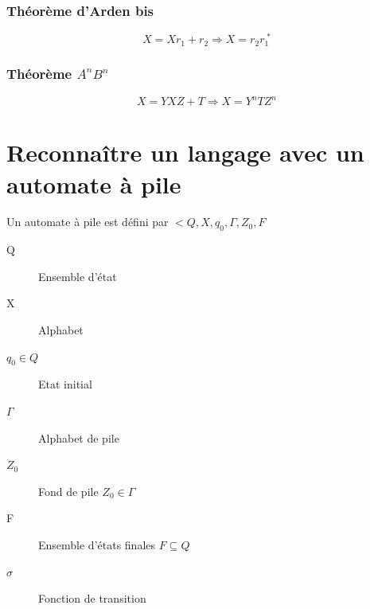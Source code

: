 \documentclass[12pt,a4paper,openany]{book}
\begin{document}
\subsubsection{Théorème d'Arden bis}
$$X = Xr_1+r_2 \Rightarrow X=r_2r_1^{\;*}$$

\subsubsection{Théorème $A^nB^n$}
$$X = YXZ+T \Rightarrow X = Y^nTZ^n$$

\section{Reconnaître un langage avec un automate à pile}
	Un automate à pile est défini par $<Q,X,q_0,\Gamma, Z_0,F$
	\begin{description}
		\item[Q] Ensemble d'état
		\item[X] Alphabet
		\item[$q_0 \in Q$] Etat initial
		\item[$\Gamma$] Alphabet de pile
		\item[$Z_0$] Fond de pile $Z_0 \in \Gamma$
		\item[F] Ensemble d'états finales $F\subseteq Q$
		\item[$\sigma$] Fonction de transition 
	\end{description}
\end{document}
